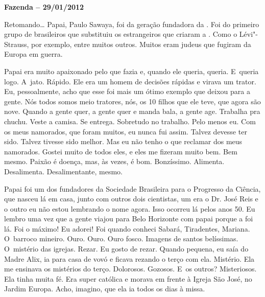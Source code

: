 \begin{center}\asterisc{}\end{center}

\begin{flushright}\textbf{Fazenda -- 29/01/2012}\end{flushright}


Retomando… Papai, Paulo Sawaya, foi da geração fundadora da .
Foi do primeiro grupo de brasileiros que substituiu os estrangeiros que
criaram a . Como o Lévi"-Strauss, por exemplo, entre muitos outros.
Muitos eram judeus que fugiram da Europa em guerra.

Papai era muito apaixonado pelo que fazia e, quando ele queria, queria.
E~queria logo. A~jato. Rápido. Ele era um homem de decisões rápidas e
virava um trator. Eu, pessoalmente, acho que esse foi mais um ótimo
exemplo que deixou para a gente. Nós todos somos meio tratores, nós, os
10 filhos que ele teve, que agora são nove. Quando a gente quer, a gente
quer e manda bala, a gente age. Trabalha pra chuchu. Veste a camisa. Se
entrega. Sobretudo no trabalho. Pelo menos eu. Com os meus namorados,
que foram muitos, eu nunca fui assim. Talvez devesse ter sido. Talvez
tivesse sido melhor. Mas eu não tenho o que reclamar dos meus namorados.
Gostei muito de todos eles, e eles me fizeram muito bem. Bem mesmo.
Paixão é doença, mas, às vezes, é bom. Bonzíssimo. Alimenta.
Desalimenta. Desalimentante, mesmo.

Papai foi um dos fundadores da Sociedade Brasileira para o Progresso da
Ciência, que nasceu lá em casa, junto com outros dois cientistas, um era
o Dr. José Reis e o outro eu não estou lembrando o nome agora. Isso
ocorreu lá pelos anos 50. Eu lembro uma vez que a gente viajou para Belo
Horizonte com papai porque a  foi lá. Foi o máximo! Eu adorei! Foi
quando conheci Sabará, Tiradentes, Mariana. O~barroco mineiro. Ouro.
Ouro. Ouro fosco. Imagens de santos belíssimas. O~mistério das igrejas.
Rezar. Eu gosto de rezar. Quando pequena, eu saía do Madre Alix, ia para
casa de vovó e ficava rezando o terço com ela. Mistério. Ela me ensinava
os mistérios do terço. Dolorosos. Gozosos. E~os outros? Misteriosos. Ela
tinha muita fé. Era super católica e morava em frente à Igreja São José,
no Jardim Europa. Acho, imagino, que ela ia todos os dias à missa.

